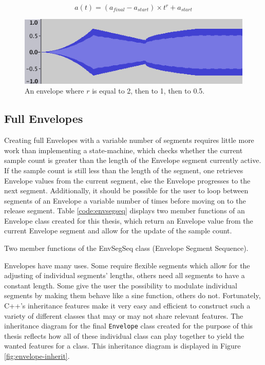 \documentclass[12pt,twoside]{report}
\begin{document}
\begin{equation}
  a(t) = (a_{final} - a_{start}) \times t^r + a_{start}
  \label{eq:power}
\end{equation}

\begin{figure}
  \includegraphics[scale=0.7]{img/rates}
  \caption{An envelope where $r$ is equal to 2, then to 1, then to 0.5.}
  \label{fig:rates}
\end{figure}

\subsection{Full Envelopes}

Creating full Envelopes with a variable number of segments requires little more work than implementing a state-machine, which checks whether the current sample count is greater than the length of the Envelope segment currently active. If the sample count is still less than the length of the segment, one retrieves Envelope values from the current segment, else the Envelope progresses to the next segment. Additionally, it should be possible for the user to loop between segments of an Envelope a variable number of times before moving on to the release segment. Table \ref{code:envsegseq} displays two member functions of an Envelope class created for this thesis, which return an Envelope value from the current Envelope segment and allow for the update of the sample count.\\

\begin{table}
  \caption{Two member functions of the EnvSegSeq class (Envelope Segment Sequence).}
  \label{code:envsegseq}
\end{table}

\noindent Envelopes have many uses. Some require flexible segments which allow for the adjusting of individual segments' lengths, others need all segments to have a constant length. Some give the user the possibility to modulate individual segments by making them behave like a sine function, others do not. Fortunately, C++'s inheritance features make it very easy and efficient to construct such a variety of different classes that may or may not share relevant features. The inheritance diagram for the final \texttt{Envelope} class created for the purpose of this thesis reflects how all of these individual class can play together to yield the wanted features for a class. This inheritance diagram is displayed in Figure \ref{fig:envelope-inherit}.
\end{document}
